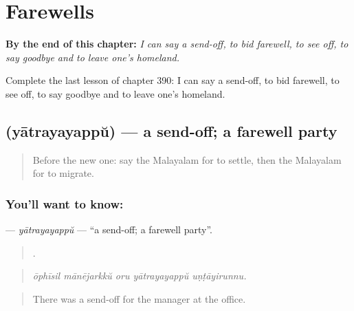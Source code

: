 
\chapter{Farewells}
\label{ch:ml-farewells}

\begin{chapteropening}
\textbf{By the end of this chapter:} \emph{I can say a send-off, to bid farewell, to see off, to say goodbye and to leave one's homeland.}

Complete the last lesson of chapter 390: I can say a send-off, to bid farewell, to see off, to say goodbye and to leave one's homeland.
\end{chapteropening}

\section[\texorpdfstring{\ml{യാത്രയയപ്പ്} (yātrayayappŭ)}{യാത്രയയപ്പ് (yātrayayappŭ)}]{ (yātrayayappŭ) — a send-off; a farewell party}

\label{lesson:ML-C390-yatrayayappu}



\begin{quote}
Before the new one: say the Malayalam for to settle, then the Malayalam for to migrate.
\end{quote}

\subsection*{You'll want to know: }
\textbf{} — \emph{yātrayayappŭ} — \textquotedblleft{}a send-off; a farewell party\textquotedblright{}.

\begin{quote}
    .
\end{quote}

\begin{quote}
\emph{ōphīsil mānējarkkŭ oru yātrayayappŭ uṇṭāyirunnu.}
\end{quote}

\begin{quote}
There was a send-off for the manager at the office.
\end{quote}

